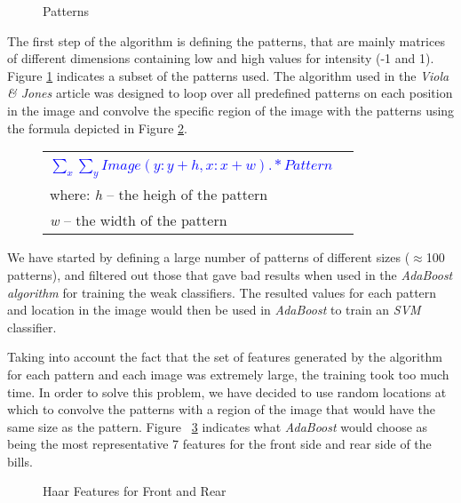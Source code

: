 \documentclass[11pt,twocolumn]{article}
\begin{document}
			\begin{figure}[!hbtp]
				\caption{Patterns}
				\label{patterns}
			\end{figure}

			The first step of the algorithm is defining the patterns, that are mainly matrices of different dimensions containing low and high values for intensity (-1 and 1). Figure \ref{patterns} indicates a subset of the patterns used. The algorithm used in the \emph{Viola \& Jones} article was designed to loop over all predefined patterns on each position in the image and convolve the specific region of the image with the patterns using the formula depicted in Figure \ref{patterns_formula}.
			
			\begin{figure}
				\selectfont\small
				\caption{}
				\begin{tabular}{|lr|} \hline
					& \\[5pt]
					\textcolor{blue}{$\sum_x\sum_y Image(y:y+h,x:x+w) .* Pattern$} &\\[10pt]
					where: \emph{h} -- the heigh of the pattern &\\
					\hspace*{28px} \emph{w} -- the width of the pattern &\\[5pt] 
					\hline 
				\end{tabular}
				\label{patterns_formula}
			\end{figure}
			
			We have started by defining a large number of patterns of different sizes ($\approx$100 patterns), and filtered out those that gave bad results when used in the \emph{AdaBoost algorithm} for training the weak classifiers. The resulted values for each pattern and location in the image would then be used in \emph{AdaBoost} to train an \emph{SVM} classifier. 
			
			Taking into account the fact that the set of features generated by the algorithm for each pattern and each image was extremely large, the training took too much time. In order to solve this problem, we have decided to use random locations at which to convolve the patterns with a region of the image that would have the same size as the pattern. Figure~ \ref{Haar_features} indicates what \emph{AdaBoost} would choose as being the most representative 7 features for the front side and rear side of the bills.

			\begin{figure}[!hbtp]
				\centering
				\caption{Haar Features for Front and Rear}
				\label{Haar_features}
			\end{figure}
\end{document}
